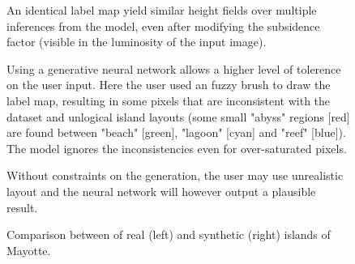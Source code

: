 






\begin{figure}
    \caption{An identical label map yield similar height fields over multiple inferences from the model, even after modifying the subsidence factor (visible in the luminosity of the input image).}
    \label{fig:coral-island_results-subsidence}
\end{figure}
\begin{figure}
    \caption{Using a generative neural network allows a higher level of tolerence on the user input. Here the user used an fuzzy brush to draw the label map, resulting in some pixels that are inconsistent with the dataset and unlogical island layouts (some small "abyss" regions [red] are found between "beach" [green], "lagoon" [cyan] and "reef" [blue]). The model ignores the inconsistencies even for over-saturated pixels. }
    \label{fig:coral-island_results-fuzzy}
\end{figure}
\begin{figure}
    \caption{Without constraints on the generation, the user may use unrealistic layout and the neural network will however output a plausible result.}
    \label{fig:coral-island_results_dino}
\end{figure}
\begin{figure}
    \caption{Comparison between of real (left) and synthetic (right) islands of Mayotte.}
    \label{fig:coral-island_example-Mayotte}
\end{figure}



